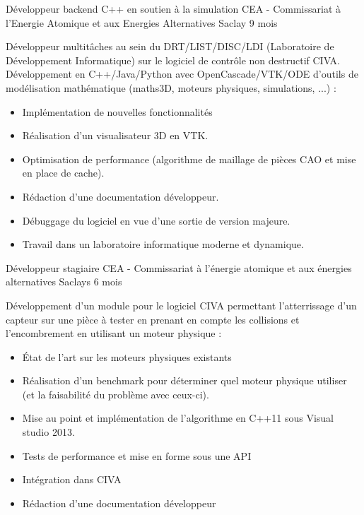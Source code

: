 \documentclass[11pt,a4paper,sans]{moderncv} %
\begin{document}

{Développeur backend C++ en soutien à la simulation}
{CEA - Commissariat à l'Energie Atomique et aux Energies Alternatives}
{Saclay}
{9 mois}
{Développeur multitâches au sein du DRT/LIST/DISC/LDI (Laboratoire de Développement Informatique) sur le logiciel de contrôle non destructif CIVA.
	Développement en C++/Java/Python avec OpenCascade/VTK/ODE d'outils de modélisation mathématique (maths3D, moteurs physiques, simulations, ...) :
	\begin{itemize}
		\item Implémentation de nouvelles fonctionnalités
		\item Réalisation d'un visualisateur 3D en VTK.
		\item Optimisation de performance (algorithme de maillage de pièces CAO et mise en place de cache).
		\item Rédaction d'une documentation développeur.
		\item Débuggage du logiciel en vue d'une sortie de version majeure.
		\item Travail dans un laboratoire informatique moderne et dynamique.
	\end{itemize}}


{Développeur stagiaire}
{CEA - Commissariat à l'énergie atomique et aux énergies alternatives}
{Saclays}
{6 mois}
{Développement d’un module pour le logiciel CIVA permettant l’atterrissage d’un capteur sur une pièce à tester en prenant en compte les collisions et l’encombrement en utilisant un moteur physique :
	\begin{itemize}
		\item \'{E}tat de l’art sur les moteurs physiques existants
		\item Réalisation d’un benchmark pour déterminer quel moteur physique utiliser (et la faisabilité du problème avec ceux-ci).
		\item Mise au point et implémentation de l’algorithme en C++11 sous Visual studio 2013.
		\item Tests de performance et mise en forme sous une API
		\item Intégration dans CIVA
		\item Rédaction d’une documentation développeur
	\end{itemize}}

\end{document}
